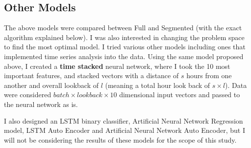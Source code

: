 \subsection{Other Models}

The above models were compared between Full and Segmented (with the exact algorithm explained below). I was also interested in changing the problem space to find the most optimal model. I tried various other models including ones that implemented time series analysis into the data. Using the same model proposed above, I created a \textbf{time stacked} neural network, where I took the 10 most important features, and stacked vectors with a distance of $s$ hours from one another and overall lookback of $l$ (meaning a total hour look back of $s \times l$). Data were considered $batch \times lookback \times 10$ dimensional input vectors and passed to the neural network as is. 

I also designed an LSTM binary classifier, Artificial Neural Network Regression model, LSTM Auto Encoder and Artificial Neural Network Auto Encoder, but I will not be considering the results of these models for the scope of this study.
